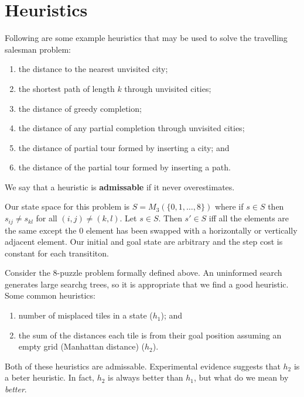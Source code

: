 \chapter{Heuristics}

\begin{example}
    Following are some example heuristics that may be used to solve the travelling salesman problem:
    \begin{enumerate}
        \item the distance to the nearest unvisited city;
        \item the shortest path of length $k$ through unvisited cities;
        \item the distance of greedy completion;
        \item the distance of any partial completion through unvisited cities;
        \item the distance of partial tour formed by inserting a city; and
        \item the distance of the partial tour formed by inserting a path.
    \end{enumerate}
\end{example}

\begin{definition}[Admissable]
    We say that a heuristic is \textbf{admissable} if it never overestimates.
\end{definition}

\begin{problem}
    Our state space for this problem is $S = M_3(\{0, 1, \ldots, 8\})$ where if $s \in S$ then $s_{ij} \neq s_{kl}$ for all $(i,j) \neq (k, l)$. Let $s \in S$. Then $s' \in S$ iff all the elements are the same except the $0$ element has been swapped with a horizontally or vertically adjacent element. Our initial and goal state are arbitrary and the step cost is constant for each transititon. 
\end{problem}

\begin{example}
    Consider the 8-puzzle problem formally defined above. An uninformed search generates large searchg trees, so it is appropriate that we find a good heuristic. Some common heuristics:
    \begin{enumerate}
        \item number of misplaced tiles in a state ($h_1$); and
        \item the sum of the distances each tile is from their goal position assuming an empty grid (Manhattan distance) ($h_2$).
    \end{enumerate}
    Both of these heuristics are admissable. Experimental evidence suggests that $h_2$ is a beter heuristic. In fact, $h_2$ is always better than $h_1$, but what do we mean by \emph{better}.
\end{example}

